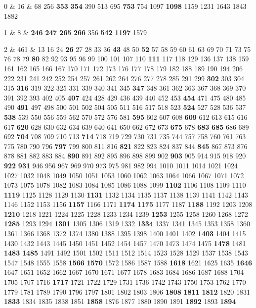 0 & 16 & 68 256 \textbf{353} \textbf{354} 390 513 695 \textbf{753} 754 1097 \textbf{1098} 1159 1231 1643 1843 1882 \\  

1 & 8 & \textbf{246} \textbf{247} \textbf{265} \textbf{266} 356 \textbf{542} \textbf{1197} 1579 \\  

2 & 461 & 13 16 24 \textbf{26} 27 28 33 36 \textbf{43} 48 50 \textbf{52} 57 58 59 60 61 63 69 70 71 73 75 76 78 79 \textbf{80} 82 92 93 95 96 99 100 101 107 110 \textbf{111} 117 118 129 136 137 138 159 161 162 165 166 167 170 171 172 173 176 177 178 179 182 188 189 190 194 206 222 231 241 242 252 254 257 261 262 264 276 277 278 285 291 299 \textbf{302} 303 304 315 \textbf{316} 319 322 325 331 339 340 341 345 \textbf{347} 348 361 362 363 367 368 369 370 391 392 393 402 405 \textbf{407} 424 428 429 436 439 440 452 453 \textbf{454} 471 475 480 485 490 \textbf{491} 497 498 500 501 502 504 505 511 516 517 518 523 \textbf{524} 527 528 536 537 \textbf{538} 539 550 556 559 562 570 572 576 581 \textbf{595} 602 607 608 \textbf{609} 612 613 615 616 617 \textbf{620} 628 630 632 634 639 640 641 650 662 672 673 \textbf{675} 678 \textbf{683} \textbf{685} 686 689 692 \textbf{704} 708 709 710 713 \textbf{714} 718 719 729 730 731 735 744 757 758 760 761 763 775 780 790 796 \textbf{797} 799 800 811 816 \textbf{821} 822 823 824 837 844 \textbf{845} 867 873 876 878 881 882 883 884 \textbf{890} 891 892 895 896 898 899 902 \textbf{903} 905 914 915 918 920 \textbf{922} \textbf{931} 946 956 967 969 970 973 975 981 982 994 1010 1011 1014 1021 1024 1027 1032 1048 1049 1050 1051 1053 1060 1062 1063 1064 1066 1067 1071 1072 1073 1075 1078 1082 1083 1084 1085 1086 1088 1099 \textbf{1102} 1106 1108 1109 1110 \textbf{1119} 1125 1128 1129 1130 \textbf{1131} 1132 1134 1135 1137 1138 1139 1141 1142 1143 1146 1152 1153 1156 \textbf{1157} 1166 1171 \textbf{1174} \textbf{1175} 1177 1187 \textbf{1188} 1192 1203 1208 \textbf{1210} 1218 1221 1224 1225 1228 1233 1234 1239 \textbf{1253} 1255 1258 1260 1268 1272 \textbf{1285} 1293 1294 \textbf{1301} 1305 1306 1319 1332 \textbf{1334} 1337 1341 1345 1353 1358 1360 1361 1366 1368 1372 1374 1380 1388 1395 1398 1400 1401 1402 \textbf{1403} 1404 1415 1430 1432 1443 1445 1450 1451 1452 1454 1457 1470 1473 1474 1475 \textbf{1478} 1481 \textbf{1483} \textbf{1485} 1491 1492 1501 1502 1511 1512 1514 1523 1528 1529 1537 1538 1543 1547 1548 1555 1558 \textbf{1566} \textbf{1570} 1572 1586 1587 1588 \textbf{1618} 1621 1625 1635 \textbf{1646} 1647 1651 1652 1662 1667 1670 1671 1677 1678 1683 1684 1686 1687 1688 1704 1705 1707 1716 \textbf{1717} 1721 1722 1729 1731 1736 1742 1743 1750 1753 1762 1770 1779 1781 1789 1790 1796 1797 1801 1802 1803 1806 \textbf{1808} \textbf{1811} \textbf{1812} 1820 1831 \textbf{1833} 1834 1835 1838 1851 \textbf{1858} 1876 1877 1880 1890 1891 \textbf{1892} 1893 \textbf{1894} \\  

